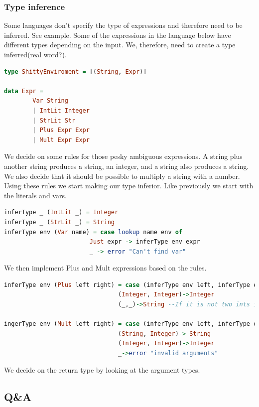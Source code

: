 \documentclass[tikz, border=5mm]{article}
\begin{document}
            \subsubsection{Type inference}
            Some languages don't specify the type of expressions and therefore need to be inferred. See example.
            Some of the expressions in the language below have different types depending on the input. We, therefore, need to create a type inferred(real word?).
            \begin{lstlisting}[language=Haskell]
type ShittyEnviroment = [(String, Expr)]

data Expr = 
        Var String
        | IntLit Integer
        | StrLit Str
        | Plus Expr Expr
        | Mult Expr Expr
            \end{lstlisting}
            We decide on some rules for those pesky ambiguous expressions. A string plus another string produces a string, an integer, and a string also produces a string.
            We also decide that it should be possible to multiply a string with a number. Using these rules we start making our type inferior.
            Like previously we start with the literals and vars.
            \begin{lstlisting}[language=Haskell]
inferType _ (IntLit _) = Integer
inferType _ (StrLit _) = String
inferType env (Var name) = case lookup name env of
                        Just expr -> inferType env expr
                        _ -> error "Can't find var"
            \end{lstlisting}
            We then implement Plus and Mult expressions based on the rules.
            \begin{lstlisting}[language=Haskell]
inferType env (Plus left right) = case (inferType env left, inferType env right) of
                                (Integer, Integer)->Integer
                                (_,_)->String --If it is not two ints it's a string!

ingerType env (Mult left right) = case (inferType env left, inferType env right) of
                                (String, Integer)-> String
                                (Integer, Integer)->Integer
                                _->error "invalid arguments"
            \end{lstlisting}
            We decide on the return type by looking at the argument types.
    \subsection{Q\&A}
\end{document}
